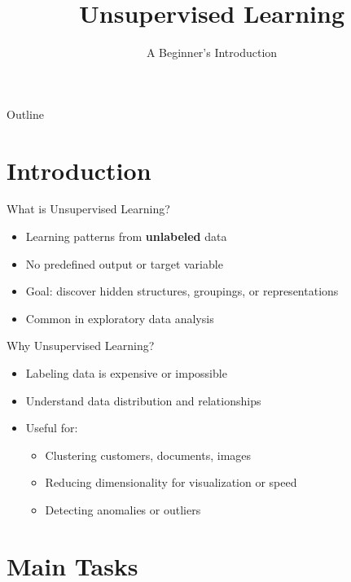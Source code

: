 \documentclass{beamer}
\title{Unsupervised Learning}
\subtitle{A Beginner's Introduction}
\date{}
\begin{document}
{
\begin{frame}
    \titlepage
\end{frame}
}

\begin{frame}{Outline}
    \tableofcontents
\end{frame}

\section{Introduction}

\begin{frame}{What is Unsupervised Learning?}
\begin{itemize}
    \item Learning patterns from \textbf{unlabeled} data
    \item No predefined output or target variable
    \item Goal: discover hidden structures, groupings, or representations
    \item Common in exploratory data analysis
\end{itemize}
\end{frame}

\begin{frame}{Why Unsupervised Learning?}
\begin{itemize}
    \item Labeling data is expensive or impossible
    \item Understand data distribution and relationships
    \item Useful for:
    \begin{itemize}
        \item Clustering customers, documents, images
        \item Reducing dimensionality for visualization or speed
        \item Detecting anomalies or outliers
    \end{itemize}
\end{itemize}
\end{frame}

\section{Main Tasks}
\end{document}
